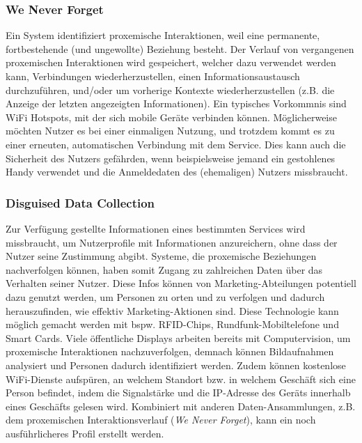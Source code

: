\documentclass[a4paper]{article}
\begin{document}
\subsubsection{We Never Forget}
Ein System identifiziert proxemische Interaktionen, weil eine permanente, fortbestehende (und ungewollte) Beziehung besteht. Der Verlauf von vergangenen proxemischen Interaktionen wird gespeichert, welcher dazu verwendet werden kann, Verbindungen wiederherzustellen, einen Informationsaustausch durchzuführen, und/oder um vorherige Kontexte wiederherzustellen (z.B. die Anzeige der letzten angezeigten Informationen).\newline
Ein typisches Vorkommnis sind WiFi Hotspots, mit der sich mobile Geräte verbinden können. Möglicherweise möchten Nutzer es bei einer einmaligen Nutzung, und trotzdem kommt es zu einer erneuten, automatischen Verbindung mit dem Service. Dies kann auch die Sicherheit des Nutzers gefährden, wenn beispielsweise jemand ein gestohlenes Handy verwendet und die Anmeldedaten des (ehemaligen) Nutzers missbraucht.

\subsubsection{Disguised Data Collection}
Zur Verfügung gestellte Informationen eines bestimmten Services wird missbraucht, um Nutzerprofile mit Informationen anzureichern, ohne dass der Nutzer seine Zustimmung abgibt. Systeme, die proxemische Beziehungen nachverfolgen können, haben somit Zugang zu zahlreichen Daten über das Verhalten seiner Nutzer. Diese Infos können von Marketing-Abteilungen potentiell dazu genutzt werden, um Personen zu orten und zu verfolgen und dadurch herauszufinden, wie effektiv Marketing-Aktionen sind. Diese Technologie kann möglich gemacht werden mit bspw. RFID-Chips, Rundfunk-Mobiltelefone und Smart Cards. Viele öffentliche Displays arbeiten bereits mit Computervision, um proxemische Interaktionen nachzuverfolgen, demnach können Bildaufnahmen analysiert und Personen dadurch identifiziert werden. Zudem können kostenlose WiFi-Dienste aufspüren, an welchem Standort bzw. in welchem Geschäft sich eine Person befindet, indem die Signalstärke und die IP-Adresse des Geräts innerhalb eines Geschäfts gelesen wird.\newline
Kombiniert mit anderen Daten-Ansammlungen, z.B. dem proxemischen Interaktionsverlauf (\textit{We Never Forget}), kann ein noch ausführlicheres Profil erstellt werden.
\end{document}
